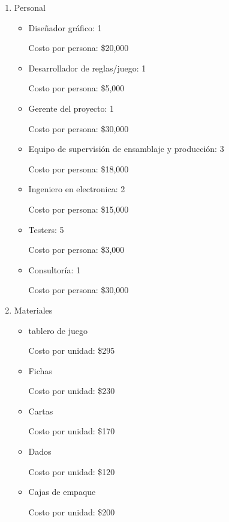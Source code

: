 \documentclass[12pt]{article}
\begin{document}
\begin{enumerate}
	\item Personal

	\begin{itemize}
		\item Diseñador gráfico: 1 

		Costo por persona: \$20,000

		\item Desarrollador de reglas/juego: 1

		Costo por persona: \$5,000

		\item Gerente del proyecto: 1

		Costo por persona: \$30,000

		\item Equipo de supervisión de ensamblaje y producción:  3

		Costo por persona: \$18,000

		\item Ingeniero en electronica: 2

		Costo por persona: \$15,000

		\item Testers: 5

		Costo por persona: \$3,000

		\item Consultoría: 1

		Costo por persona: \$30,000

	\end{itemize}

	\item Materiales 

	\begin{itemize}
		\item tablero de juego

		Costo por unidad: \$295

		\item Fichas

		Costo por unidad: \$230

		\item Cartas

		Costo por unidad: \$170

		\item Dados

		Costo por unidad: \$120

		\item Cajas de empaque

		Costo por unidad: \$200
	\end{itemize}


\end{enumerate}
\end{document}
